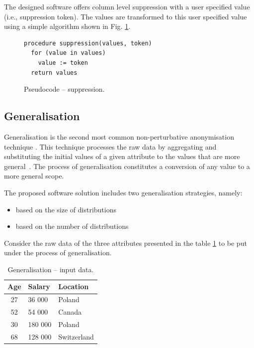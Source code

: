 \documentclass[a4paper,twoside,12pt]{book}
\begin{document}
The designed software offers column level suppression with a user specified value (i.e., suppression token). The values are transformed to this user specified value using a simple algorithm shown in Fig. \ref{fig:code:suppression}.

\begin{figure}[h]
\begin{verbatim}
procedure suppression(values, token)
  for (value in values)
    value := token
  return values
\end{verbatim}
\caption{Pseudocode – suppression.}
\label{fig:code:suppression}
\end{figure}

\subsection{Generalisation}

Generalisation is the second most common non-perturbative anonymisation technique \cite{bib:privacy_unesco_bigdata}. This technique processes the raw data by aggregating and substituting the initial values of a given attribute to the values that are more general~\cite{bib:privacy_unesco_rule_based}. The process of generalisation constitutes a conversion of any value to a more general scope.

The proposed software solution includes two generalisation strategies, namely:
\begin{itemize}
\item based on the size of distributions
\item based on the number of distributions
\end{itemize}

Consider the raw data of the three attributes presented in the table \ref{id:tab:generalisation_raw} to be put under the process of generalisation.

\begin{table}[h]
\centering
\caption{Generalisation – input data.}
\label{id:tab:generalisation_raw}
\begin{tabular}{@{}cll@{}}
\toprule
\multicolumn{1}{l}{Age} & Salary  & Location    \\ \midrule
27                      & 36 000  & Poland      \\
52                      & 54 000  & Canada      \\
30                      & 180 000 & Poland      \\
68                      & 128 000 & Switzerland \\ \bottomrule
\end{tabular}
\end{table}
\end{document}
